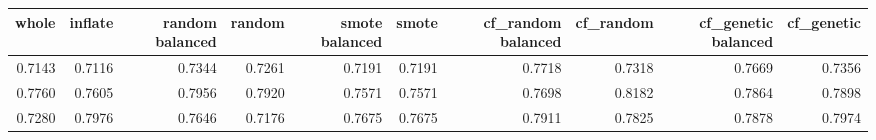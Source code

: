 \begin{tabular}{rrrrrrrrrr}
\toprule

 whole &  inflate &  random balanced &  random &  smote balanced &  smote &  cf\_random balanced &  cf\_random &  cf\_genetic balanced &  cf\_genetic \\
\midrule

0.7143 &   0.7116 &           0.7344 &  0.7261 &          0.7191 & 0.7191 &              0.7718 &     0.7318 &               0.7669 &      0.7356 \\
0.7760 &   0.7605 &           0.7956 &  0.7920 &          0.7571 & 0.7571 &              0.7698 &     0.8182 &               0.7864 &      0.7898 \\
0.7280 &   0.7976 &           0.7646 &  0.7176 &          0.7675 & 0.7675 &              0.7911 &     0.7825 &               0.7878 &      0.7974 \\

\bottomrule
\end{tabular}
